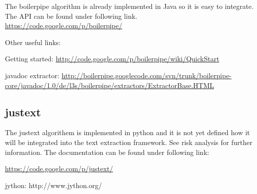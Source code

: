 The boilerpipe algorithm is already implemented in Java so it is easy to integrate. The API can be found under following link. 
\url{https://code.google.com/p/boilerpipe/}

Other useful links:

Getting started:
\url{http://code.google.com/p/boilerpipe/wiki/QuickStart}

javadoc extractor:
\url{http://boilerpipe.googlecode.com/svn/trunk/boilerpipe-core/javadoc/1.0/de/l3s/boilerpipe/extractors/ExtractorBase.HTML}


\subsection{justext}

The justext algorithem is implemented in python and it is not yet defined how it will be integrated into the text extraction framework. See risk analysis for further information.
The documentation can be found under following link: 

\url{https://code.google.com/p/justext/}

jython:
http://www.jython.org/

